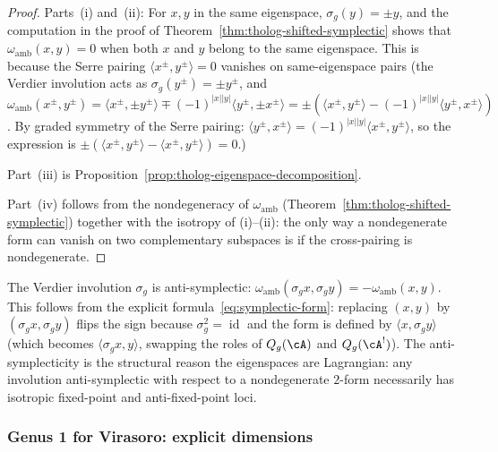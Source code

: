 \begin{proof}
Parts~(i) and~(ii): For $x, y$ in the same eigenspace,
$\sigma_g(y) = \pm y$, and the computation in the proof of
Theorem~\ref{thm:tholog-shifted-symplectic} shows that
$\omega_{\mathrm{amb}}(x, y) = 0$
when both $x$ and $y$ belong to the same eigenspace.
This is because the Serre pairing
$\langle x^\pm, y^\pm \rangle = 0$ vanishes on same-eigenspace pairs
(the Verdier involution acts as $\sigma_g(y^\pm) = \pm y^\pm$, and
$\omega_{\mathrm{amb}}(x^\pm, y^\pm)
= \langle x^\pm, \pm y^\pm \rangle
\mp (-1)^{|x||y|}\langle y^\pm, \pm x^\pm \rangle
= \pm(\langle x^\pm, y^\pm \rangle
- (-1)^{|x||y|}\langle y^\pm, x^\pm \rangle)$.
By graded symmetry of the Serre pairing:
$\langle y^\pm, x^\pm \rangle
= (-1)^{|x||y|}\langle x^\pm, y^\pm \rangle$,
so the expression is
$\pm(\langle x^\pm, y^\pm \rangle
- \langle x^\pm, y^\pm \rangle) = 0$.)

Part~(iii) is Proposition~\ref{prop:tholog-eigenspace-decomposition}.

Part~(iv) follows from the nondegeneracy of
$\omega_{\mathrm{amb}}$ (Theorem~\ref{thm:tholog-shifted-symplectic})
together with the isotropy of (i)--(ii): the only way a
nondegenerate form can vanish on two complementary subspaces
is if the cross-pairing is nondegenerate.
\end{proof}

\begin{remark}
The Verdier involution $\sigma_g$ is anti-symplectic:
$\omega_{\mathrm{amb}}(\sigma_g x, \sigma_g y)
= -\omega_{\mathrm{amb}}(x, y)$.
This follows from the explicit
formula~\eqref{eq:symplectic-form}:
replacing $(x, y)$ by $(\sigma_g x, \sigma_g y)$ flips
the sign because $\sigma_g^2 = \operatorname{id}$ and the
form is defined by $\langle x, \sigma_g y \rangle$ (which
becomes $\langle \sigma_g x, y \rangle$, swapping the
roles of $Q_g(\cA)$ and $Q_g(\cA^!)$).
The anti-symplecticity is the structural reason the
eigenspaces are Lagrangian: any involution anti-symplectic
with respect to a nondegenerate $2$-form necessarily has
isotropic fixed-point and anti-fixed-point loci.
\end{remark}

\subsubsection{Genus 1 for Virasoro: explicit dimensions}

